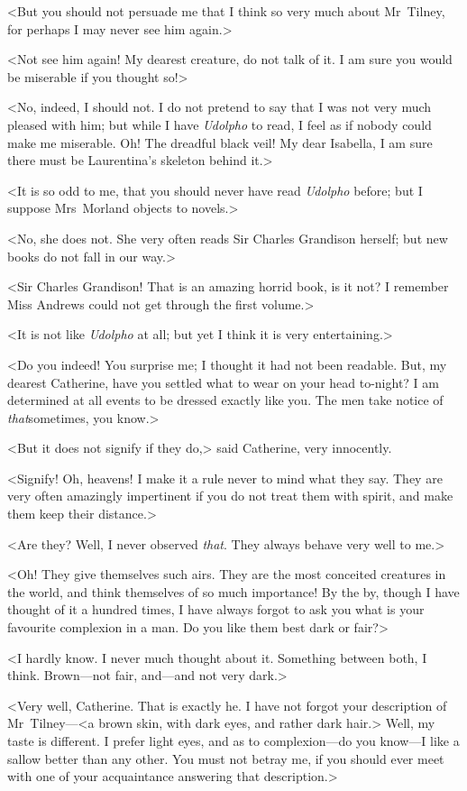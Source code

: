  <But you should not persuade me that I think so very much about Mr~Tilney, for perhaps I may never see him again.> 

 <Not see him again! My dearest creature, do not talk of it. I am sure you would be miserable if you thought so!> 

 <No, indeed, I should not. I do not pretend to say that I was not very much pleased with him; but while I have \textit{Udolpho} to read, I feel as if nobody could make me miserable. Oh! The dreadful black veil! My dear Isabella, I am sure there must be Laurentina's skeleton behind it.> 

 <It is so odd to me, that you should never have read \textit{Udolpho} before; but I suppose Mrs~Morland objects to novels.> 

 <No, she does not. She very often reads Sir Charles Grandison herself; but new books do not fall in our way.> 

 <Sir Charles Grandison! That is an amazing horrid book, is it not? I remember Miss Andrews could not get through the first volume.> 

 <It is not like \textit{Udolpho} at all; but yet I think it is very entertaining.> 

 <Do you indeed! You surprise me; I thought it had not been readable. But, my dearest Catherine, have you settled what to wear on your head to-night? I am determined at all events to be dressed exactly like you. The men take notice of \textit{that}sometimes, you know.> 

 <But it does not signify if they do,> said Catherine, very innocently. 

 <Signify! Oh, heavens! I make it a rule never to mind what they say. They are very often amazingly impertinent if you do not treat them with spirit, and make them keep their distance.> 

 <Are they? Well, I never observed \textit{that}. They always behave very well to me.> 

 <Oh! They give themselves such airs. They are the most conceited creatures in the world, and think themselves of so much importance! By the by, though I have thought of it a hundred times, I have always forgot to ask you what is your favourite complexion in a man. Do you like them best dark or fair?> 

 <I hardly know. I never much thought about it. Something between both, I think. Brown—not fair, and—and not very dark.> 

 <Very well, Catherine. That is exactly he. I have not forgot your description of Mr~Tilney—<a brown skin, with dark eyes, and rather dark hair.> Well, my taste is different. I prefer light eyes, and as to complexion—do you know—I like a sallow better than any other. You must not betray me, if you should ever meet with one of your acquaintance answering that description.> 

